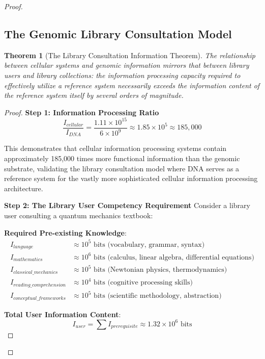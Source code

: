 \documentclass[12pt,a4paper]{article}
\newtheorem{theorem}{Theorem}[section]
\begin{document}
\begin{proof}
\subsection{The Genomic Library Consultation Model}

\begin{theorem}[The Library Consultation Information Theorem]
The relationship between cellular systems and genomic information mirrors that between library users and library collections: the information processing capacity required to effectively utilize a reference system necessarily exceeds the information content of the reference system itself by several orders of magnitude.
\end{theorem}

\begin{proof}
\textbf{Step 1: Information Processing Ratio}
\begin{equation}
\frac{I_{cellular}}{I_{DNA}} = \frac{1.11 \times 10^{15}}{6 \times 10^9} \approx 1.85 \times 10^5 \approx 185,000
\end{equation}

This demonstrates that cellular information processing systems contain approximately 185,000 times more functional information than the genomic substrate, validating the library consultation model where DNA serves as a reference system for the vastly more sophisticated cellular information processing architecture.

\textbf{Step 2: The Library User Competency Requirement}
Consider a library user consulting a quantum mechanics textbook:

\textbf{Required Pre-existing Knowledge}:
\begin{align}
I_{language} &\approx 10^5 \text{ bits (vocabulary, grammar, syntax)} \\
I_{mathematics} &\approx 10^6 \text{ bits (calculus, linear algebra, differential equations)} \\
I_{classical\_mechanics} &\approx 10^5 \text{ bits (Newtonian physics, thermodynamics)} \\
I_{reading\_comprehension} &\approx 10^4 \text{ bits (cognitive processing skills)} \\
I_{conceptual\_frameworks} &\approx 10^5 \text{ bits (scientific methodology, abstraction)}
\end{align}

\textbf{Total User Information Content}:
\begin{equation}
I_{user} = \sum I_{prerequisite} \approx 1.32 \times 10^6 \text{ bits}
\end{equation}


\end{proof}
\end{proof}
\end{document}
